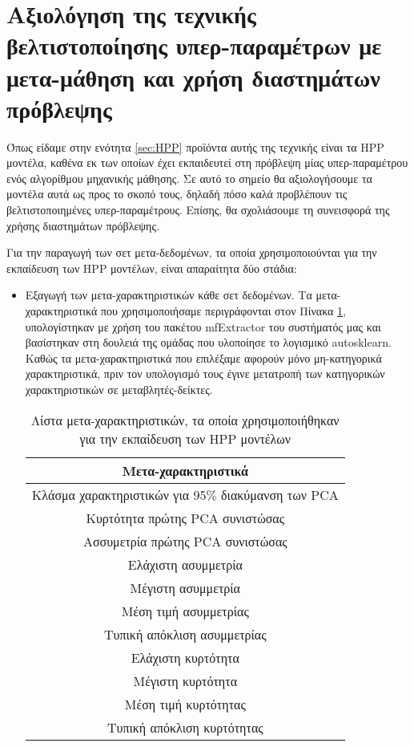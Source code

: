 \section{Αξιολόγηση της τεχνικής βελτιστοποίησης υπερ-παραμέτρων με μετα-μάθηση και χρήση διαστημάτων πρόβλεψης}
Όπως είδαμε στην ενότητα \ref{sec:HPP} προϊόντα αυτής της τεχνικής είναι τα HPP μοντέλα, καθένα εκ των οποίων έχει εκπαιδευτεί στη πρόβλεψη μίας υπερ-παραμέτρου ενός αλγορίθμου μηχανικής μάθησης. Σε αυτό το σημείο θα αξιολογήσουμε τα μοντέλα αυτά ως προς το σκοπό τους, δηλαδή πόσο καλά προβλέπουν τις βελτιστοποιημένες υπερ-παραμέτρους. Επίσης, θα σχολιάσουμε τη συνεισφορά της χρήσης διαστημάτων πρόβλεψης.

Για την παραγωγή των σετ μετα-δεδομένων, τα οποία χρησιμοποιούνται για την εκπαίδευση των HPP μοντέλων, είναι απαραίτητα δύο στάδια:
\begin{itemize}
	\item Εξαγωγή των μετα-χαρακτηριστικών κάθε σετ δεδομένων. Τα μετα-χαρακτηριστικά που χρησιμοποιήσαμε περιγράφονται στον Πίνακα \ref{table:meta}, υπολογίστηκαν με χρήση του πακέτου mf\-Extractor του συστήματός μας και βασίστηκαν στη δουλειά της ομάδας που υλοποίησε το λογισμικό autosklearn. Καθώς τα μετα-χαρακτηριστικά που επιλέξαμε αφορούν μόνο μη-κατηγορικά χαρακτηριστικά, πριν τον υπολογισμό τους έγινε μετατροπή των κατηγορικών χαρακτηριστικών σε μεταβλητές-δείκτες. 
	 \begin{table}[!htb]
	 	\begin{center}
	 	\caption{Λίστα μετα-χαρακτηριστικών, τα οποία χρησιμοποιήθηκαν για την εκπαίδευση των HPP μοντέλων}
	 	\label{table:meta}
	 		\begin{tabular}{ |c| } 
	 			\hline
	 			Μετα-χαρακτηριστικά\\
	 			\hline
	 			Κλάσμα χαρακτηριστικών για 95$\%$ διακύμανση των PCA \\ 
	 			Κυρτότητα πρώτης PCA συνιστώσας   \\ 
	 			Ασσυμετρία πρώτης PCA συνιστώσας   \\ 
	 			Ελάχιστη ασυμμετρία \\
	 			Μέγιστη ασυμμετρία \\
	 			Μέση τιμή ασυμμετρίας \\
	 			Τυπική απόκλιση ασυμμετρίας \\
	 			Ελάχιστη κυρτότητα \\
	 			Μέγιστη κυρτότητα \\
	 			Μέση τιμή κυρτότητας \\
	 			Τυπική απόκλιση κυρτότητας \\        	

\end{tabular}
\end{center}
\end{table}
\end{itemize}
